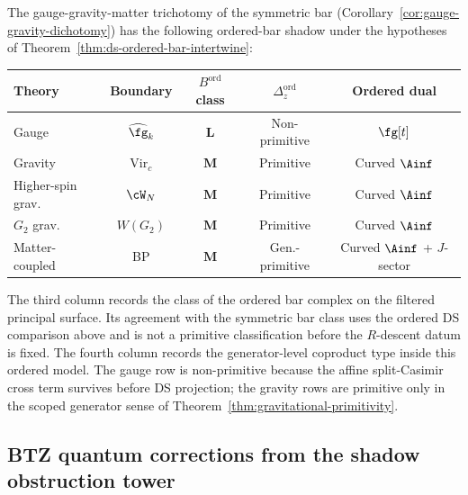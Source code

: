 \begin{remark}
\label{rem:gauge-gravity-matter-ordered}
%
The gauge-gravity-matter trichotomy of the
symmetric bar (Corollary~\ref{cor:gauge-gravity-dichotomy})
has the following ordered-bar shadow under the hypotheses of
Theorem~\ref{thm:ds-ordered-bar-intertwine}:
\begin{center}
\small
\renewcommand{\arraystretch}{1.3}
\begin{tabular}{lcccc}
\toprule
\textbf{Theory} & \textbf{Boundary}
 & \textbf{$B^{\mathrm{ord}}$ class}
 & \textbf{$\Delta_z^{\mathrm{ord}}$}
 & \textbf{Ordered dual} \\
\midrule
Gauge & $\widehat{\fg}_k$ &
 $\mathbf{L}$ & Non-primitive & $\fg[t]$ \\
Gravity & $\mathrm{Vir}_c$ &
 $\mathbf{M}$ & Primitive & Curved $\Ainf$ \\
Higher-spin grav. & $\cW_N$ &
 $\mathbf{M}$ & Primitive & Curved $\Ainf$ \\
$G_2$ grav. & $W(G_2)$ &
 $\mathbf{M}$ & Primitive & Curved $\Ainf$ \\
Matter-coupled & BP &
 $\mathbf{M}$ & Gen.-primitive &
 Curved $\Ainf$ + $J$-sector \\
\bottomrule
\end{tabular}
\end{center}
The third column records the class of the ordered bar complex
on the filtered principal surface.  Its agreement with the symmetric
bar class uses the ordered DS comparison above and is not a primitive
classification before the \(R\)-descent datum is fixed. The fourth
column records the generator-level coproduct type inside this ordered
model.  The gauge row is non-primitive because the affine split-Casimir
cross term survives before DS projection; the gravity rows are
primitive only in the scoped generator sense of
Theorem~\ref{thm:gravitational-primitivity}.
\end{remark}

%
%

\subsection{BTZ quantum corrections from the shadow obstruction tower}
\label{subsec:gravity-btz-quantum}

